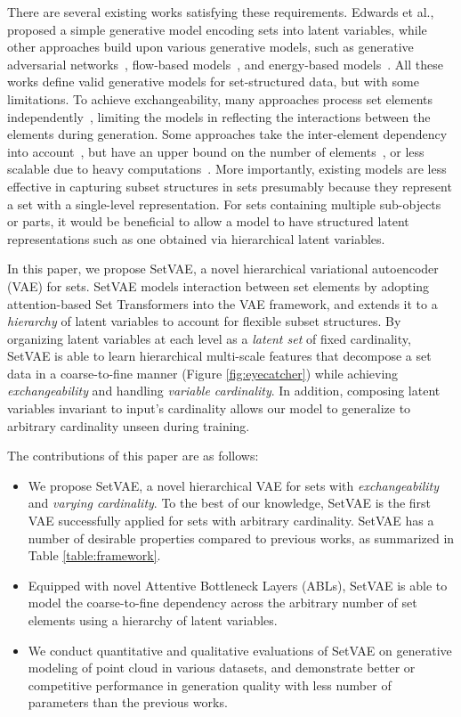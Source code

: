 \documentclass[final]{arxiv/cvpr}
\begin{document}
There are several existing works satisfying these requirements.
Edwards et al.,~\cite{edwards2017neural} proposed a simple generative model encoding sets into latent variables, while other approaches build upon various generative models, such as generative adversarial networks~\cite{li2018point, stelzner2020generative}, flow-based models~\cite{yang2019pointflow,kim2020softflow}, and energy-based models~\cite{yang2020energybased}.
All these works define valid generative models for set-structured data, but with some limitations.
To achieve exchangeability, many approaches process set elements independently~\cite{li2018point, yang2019pointflow}, limiting the models in reflecting the interactions between the elements during generation.
Some approaches take the inter-element dependency into account~\cite{stelzner2020generative, yang2020energybased}, but have an upper bound on the number of elements~\cite{stelzner2020generative}, or less scalable due to heavy computations~\cite{yang2020energybased}.
More importantly, existing models are less effective in capturing subset structures in sets presumably because they represent a set with a single-level representation.
For sets containing multiple sub-objects or parts, it would be beneficial to allow a model to have structured latent representations such as one obtained via hierarchical latent variables.

In this paper, we propose SetVAE, a novel hierarchical variational autoencoder (VAE) for sets. SetVAE models interaction between set elements by adopting attention-based Set Transformers \cite{lee2019set} into the VAE framework, and extends it to a \textit{hierarchy} of latent variables \cite{sonderby2016ladder, vahdat2020nvae} to account for flexible subset structures.
By organizing latent variables at each level as a \textit{latent set} of fixed cardinality, SetVAE is able to learn hierarchical multi-scale features that decompose a set data in a coarse-to-fine manner (Figure \ref{fig:eyecatcher}) while achieving \textit{exchangeability} and handling \textit{variable cardinality}.
In addition, composing latent variables invariant to input's cardinality allows our model to generalize to arbitrary cardinality unseen during training.

The contributions of this paper are as follows:
\begin{itemize}
    \item We propose SetVAE, a novel hierarchical VAE for sets with \textit{exchangeability} and \textit{varying cardinality}.  To the best of our knowledge, SetVAE is the first VAE successfully applied for sets with arbitrary cardinality. SetVAE has a number of desirable properties compared to previous works, as summarized in Table \ref{table:framework}.
    \item Equipped with novel Attentive Bottleneck Layers (ABLs), SetVAE is able to model the coarse-to-fine dependency across the arbitrary number of set elements using a hierarchy of latent variables.
    \item We conduct quantitative and qualitative evaluations of SetVAE on generative modeling of point cloud in various datasets, and demonstrate better or competitive performance in generation quality with less number of parameters than the previous works.
\end{itemize}
\end{document}

